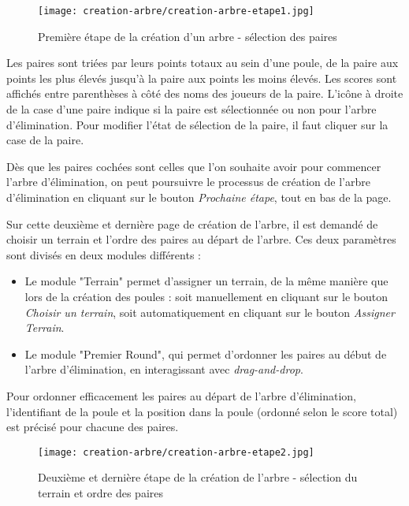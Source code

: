 \begin{figure}[H]
\centering
\texttt{[image: creation-arbre/creation-arbre-etape1.jpg]}
\caption{Première étape de la création d'un arbre - sélection des paires}
\end{figure}

Les paires sont triées par leurs points totaux au sein d'une poule, de la paire aux points les plus élevés jusqu'à la paire aux points les moins élevés. Les scores sont affichés entre parenthèses à côté des noms des joueurs de la paire. L'icône à droite de la case d'une paire indique si la paire est sélectionnée ou non pour l'arbre d'élimination. Pour modifier l'état de sélection de la paire, il faut cliquer sur la case de la paire.\newline

Dès que les paires cochées sont celles que l'on souhaite avoir pour commencer l'arbre d'élimination, on peut poursuivre le processus de création de l'arbre d'élimination en cliquant sur le bouton \textit{Prochaine étape}, tout en bas de la page.\newline

Sur cette deuxième et dernière page de création de l'arbre, il est demandé de choisir un terrain et l'ordre des paires au départ de l'arbre. Ces deux paramètres sont divisés en deux modules différents :

\begin{itemize}
\item Le module "Terrain" permet d'assigner un terrain, de la même manière que lors de la création des poules : soit manuellement en cliquant sur le bouton \textit{Choisir un terrain}, soit automatiquement en cliquant sur le bouton \textit{Assigner Terrain}.
\item Le module "Premier Round", qui permet d'ordonner les paires au début de l'arbre d'élimination, en interagissant avec \textit{drag-and-drop}.
\end{itemize}
\bigskip

Pour ordonner efficacement les paires au départ de l'arbre d'élimination, l'identifiant de la poule et la position dans la poule (ordonné selon le score total) est précisé pour chacune des paires.

\begin{figure}[H]
\centering
\texttt{[image: creation-arbre/creation-arbre-etape2.jpg]}
\caption{Deuxième et dernière étape de la création de l'arbre - sélection du terrain et ordre des paires}
\end{figure}


